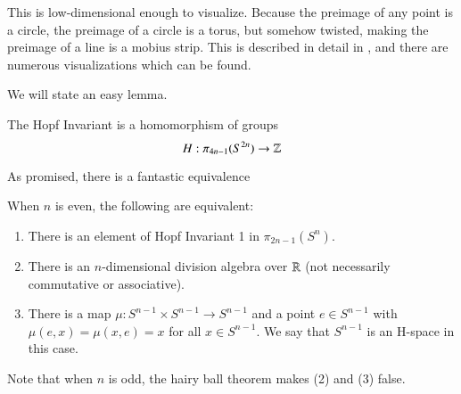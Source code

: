This is low-dimensional enough to visualize.  Because the preimage of any point is a circle, the preimage of a circle is a torus, but somehow twisted,  making the preimage of a line is a mobius strip.  This is described in detail in \cite[Example~4.45]{HatcherAT}, and there are numerous visualizations which can be found.  

We will state an easy lemma.  
\begin{Lemma}
  The Hopf Invariant is a homomorphism of groups 
  \[H:\pi_{4n-1}(S^{2n})\to \mathbb{Z}\]
\end{Lemma}


As promised, there is a fantastic equivalence
\begin{Theorem}
  When $n$ is even, the following are equivalent:
  \begin{enumerate}
    \item There is an element of Hopf Invariant 1 in $\pi_{2n-1}(S^n)$.
    \item There is an $n$-dimensional division algebra over $\mathbb{R}$ (not necessarily commutative or associative).
    \item There is a map $\mu:S^{n-1}\times S^{n-1}\to S^{n-1}$ and a point $e\in S^{n-1}$ with $\mu(e,x)=\mu(x,e)=x$ for all $x\in S^{n-1}$.  We say that $S^{n-1}$ is an H-space in this case. 
  \end{enumerate}
\end{Theorem}
Note that when $n$ is odd, the hairy ball theorem makes (2) and (3) false.  

